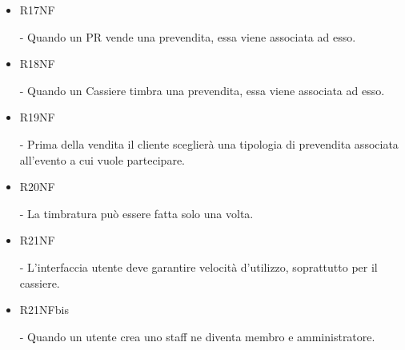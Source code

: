 \documentclass[a4paper]{article}
\begin{document}
\begin{itemize}
	\item \hypertarget{R17NF}{R17NF} - Quando un PR vende una prevendita, essa viene associata ad esso.
	\item \hypertarget{R18NF}{R18NF} - Quando un Cassiere timbra una prevendita, essa viene associata ad esso.
	
	\item \hypertarget{R19NF}{R19NF} - Prima della vendita il cliente sceglierà una tipologia di prevendita associata all'evento a cui vuole partecipare.
	
	\item \hypertarget{R20NF}{R20NF} - La timbratura può essere fatta solo una volta.
	
	\item \hypertarget{R21NF}{R21NF} - L'interfaccia utente deve garantire velocità d'utilizzo, soprattutto per il cassiere.
	
	\item \hypertarget{R21NFbis}{R21NFbis} - Quando un utente crea uno staff ne diventa membro e amministratore.
	
	
	
	
	
	
	
	
	
\end{itemize}
\end{document}
